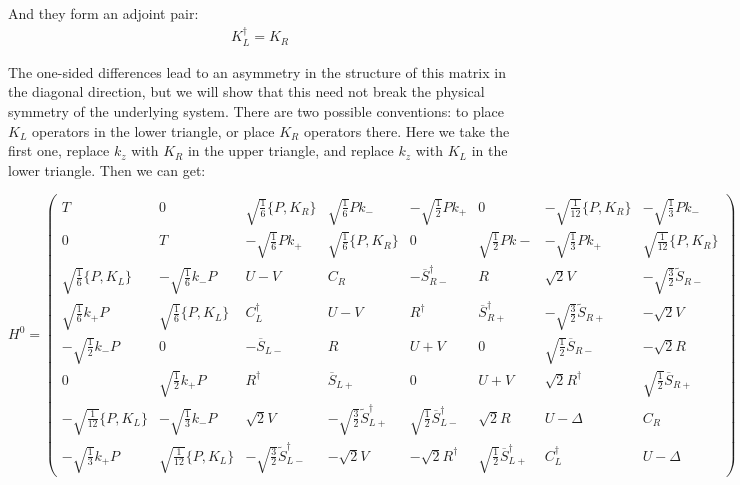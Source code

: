 \documentclass[prb,aps]{revtex4}
\begin{document}
		And they form an adjoint pair:
		\begin{align}
			K_L^\dagger = K_R
		\end{align}

The one-sided differences lead to an asymmetry in the structure of this matrix in the diagonal direction, but we will show that this need not break the physical symmetry of the underlying system. There are two possible conventions: to place $K_L$ operators in the lower triangle, or place $K_R$ operators there. Here we take the first one, replace $k_z$ with $K_R$ in the upper triangle, and replace $k_z$ with $K_L$ in the lower triangle. Then we can get:

		\begin{equation}
		    \renewcommand{\arraystretch}{3.5}
			\label{eq:H0}
			H^0=
			\begin{pmatrix}
				T & 0 &  \sqrt{\frac{1}{6}} \{P, K_R\} &\sqrt{\frac16} P k_- & -\sqrt{\frac12} P k_+  & 0  & -\sqrt{\frac{1}{12}} \{P, K_R\} & -\sqrt{\frac13} P k_-\\
				0 & T & -\sqrt{\frac16} P k_+ &  \sqrt{\frac{1}{6}} \{P, K_R\} & 0 & \sqrt{\frac12} P k- & -\sqrt{\frac13} P k_+ & \sqrt{\frac{1}{12}} \{P, K_R\}\\
				\sqrt{\frac{1}{6}} \{P, K_L\} & -\sqrt{\frac16} k_- P & U-V & C_R & - \overline{S}_{R-}^\dagger & R & \sqrt{2} V & -\sqrt{\frac32} \tilde{S}_{R-} \\
				\sqrt{\frac16} k_+ P & \sqrt{\frac{1}{6}} \{P, K_L\} & C_L^\dagger & U-V & R^\dagger & \overline{S}_{R+}^\dagger & -\sqrt{\frac32} \tilde{S}_{R+} & -\sqrt{2} V \\
				-\sqrt{\frac12}  k_- P & 0 & -\overline{S}_{L-} & R & U+V & 0 & \sqrt{\frac12} \overline{S}_{R-} & -\sqrt{2} R \\
				0 & \sqrt{\frac12} k_+ P & R^\dagger & \overline{S}_{L+} & 0 & U+V & \sqrt{2} R^\dag & \sqrt{\frac12} \overline{S}_{R+} \\
				-\sqrt{\frac{1}{12}} \{P, K_L\} & -\sqrt{\frac13} k_- P & \sqrt{2} V & -\sqrt{\frac32} \tilde{S}^\dag_{L+} & \sqrt{\frac12} \overline{S}^{\dag}_{L-} & \sqrt{2} R & U - Δ & C_R \\
				-\sqrt{\frac13} k_+ P & \sqrt{\frac{1}{12}} \{P, K_L\} & -\sqrt{\frac32} \tilde{S}_{L-}^\dag & -\sqrt{2} V & -\sqrt{2} R^\dag & \sqrt{\frac12} \overline{S}_{L+}^\dag & C_L^\dag & U - Δ
			\end{pmatrix}
		\end{equation}
		
\end{document}

